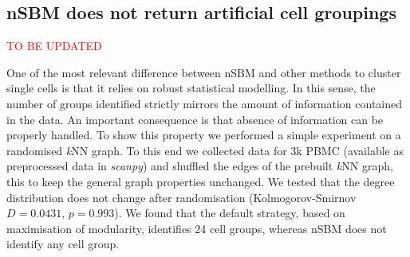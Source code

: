 \documentclass[10pt]{article}
\begin{document}

\subsection*{nSBM does not return artificial cell groupings}

\textcolor{red}{TO BE UPDATED}

One of the most relevant difference between nSBM and other methods to cluster single cells is that it relies on robust statistical modelling. In this sense, the number of groups identified strictly mirrors the amount of information contained in the data. An important consequence is that absence of information can be properly handled. To show this property we performed a simple experiment on a randomised \emph{k}NN graph. To this end we collected data for 3k PBMC (available as preprocessed data in \emph{scanpy}) and shuffled the edges of the prebuilt \emph{k}NN graph, this to keep the general graph properties unchanged. We tested that the degree distribution does not change after randomisation (Kolmogorov-Smirnov $D=0.0431$, $p=0.993$). We found that the default strategy, based on maximisation of modularity, identifies 24 cell groups, whereas nSBM does not identify any cell group. 
\end{document}
